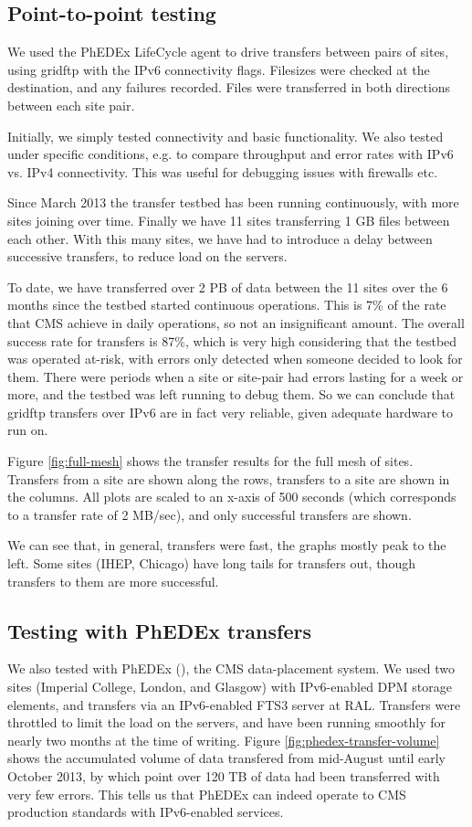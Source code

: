 \subsection{Point-to-point testing}

We used the PhEDEx LifeCycle agent \cite{LifeCycle} to drive transfers between pairs of sites, using gridftp with the IPv6 connectivity flags. Filesizes were checked at the destination, and any failures recorded. Files were transferred in both directions between each site pair.

Initially, we simply tested connectivity and basic functionality. We also tested under specific conditions, e.g. to compare throughput and error rates with IPv6 vs. IPv4 connectivity. This was useful for debugging issues with firewalls etc.

Since March 2013 the transfer testbed has been running continuously, with more sites joining over time. Finally we have 11 sites transferring 1 GB files between each other. With this many sites, we have had to introduce a delay between successive transfers, to reduce load on the servers.

To date, we have transferred over 2 PB of data between the 11 sites over the 6 months since the testbed started continuous operations. This is 7\% of the rate that CMS achieve in daily operations, so not an insignificant amount. The overall success rate for transfers is 87\%, which is very high considering that the testbed was operated at-risk, with errors only detected when someone decided to look for them.
There were periods when a site or site-pair had errors lasting for a week or more, and the testbed was left running to debug them. So we can conclude that gridftp transfers over IPv6 are in fact very reliable, given adequate hardware to run on.

Figure \ref{fig:full-mesh} shows the transfer results for the full mesh of sites. Transfers from a site are shown along the rows, transfers to a site are shown in the columns. All plots are scaled to an x-axis of 500 seconds (which corresponds to a transfer rate of 2 MB/sec), and only successful transfers are shown.

We can see that, in general, transfers were fast, the graphs mostly peak to the left. Some sites (IHEP, Chicago) have long tails for transfers out, though transfers to them are more successful.

\subsection{Testing with PhEDEx transfers}
We also tested with PhEDEx (\cite{PhEDEx}), the CMS data-placement system. We used two sites (Imperial College, London, and Glasgow) with IPv6-enabled DPM storage elements, and transfers via an IPv6-enabled FTS3 server at RAL. Transfers were throttled to limit the load on the servers, and have been running smoothly for nearly two months at the time of writing. Figure \ref{fig:phedex-transfer-volume} shows the accumulated volume of data transfered from mid-August until early October 2013, by which point over 120 TB of data had been transferred with very few errors. This tells us that PhEDEx can indeed operate to CMS production standards with IPv6-enabled services.

